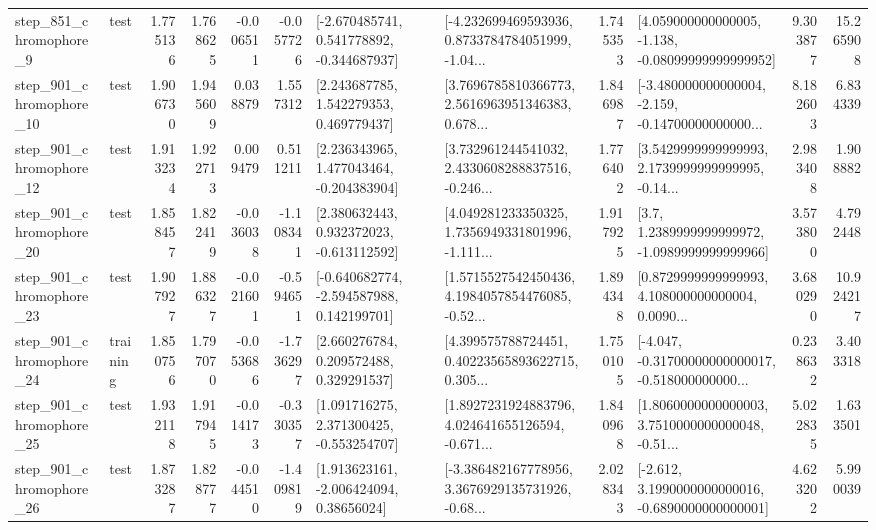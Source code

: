 \begin{tabular}{llrrrrllrlrr}
   step\_851\_chromophore\_9 &      test &      1.775136 &    1.768625 &     -0.006511 & -0.057726 &   [-2.670485741, 0.541778892, -0.344687937] &  [-4.232699469593936, 0.8733784784051999, -1.04... &       1.745353 &  [4.059000000000005, -1.138, -0.08099999999999952] &            9.303877 &         15.265908 \\
  step\_901\_chromophore\_10 &      test &      1.906730 &    1.945609 &      0.038879 &  1.557312 &     [2.243687785, 1.542279353, 0.469779437] &  [3.7696785810366773, 2.5616963951346383, 0.678... &       1.846987 &  [-3.480000000000004, -2.159, -0.14700000000000... &            8.182603 &          6.834339 \\
  step\_901\_chromophore\_12 &      test &      1.913234 &    1.922713 &      0.009479 &  0.511211 &    [2.236343965, 1.477043464, -0.204383904] &  [3.732961244541032, 2.4330608288837516, -0.246... &       1.776402 &  [3.5429999999999993, 2.1739999999999995, -0.14... &            2.983408 &          1.908882 \\
  step\_901\_chromophore\_20 &      test &      1.858457 &    1.822419 &     -0.036038 & -1.108341 &    [2.380632443, 0.932372023, -0.613112592] &  [4.049281233350325, 1.7356949331801996, -1.111... &       1.917925 &     [3.7, 1.2389999999999972, -1.0989999999999966] &            3.573800 &          4.792448 \\
  step\_901\_chromophore\_23 &      test &      1.907927 &    1.886327 &     -0.021601 & -0.594651 &   [-0.640682774, -2.594587988, 0.142199701] &  [1.5715527542450436, 4.1984057854476085, -0.52... &       1.894348 &  [0.8729999999999993, 4.108000000000004, 0.0090... &            3.680290 &         10.924217 \\
  step\_901\_chromophore\_24 &  training &      1.850756 &    1.797070 &     -0.053686 & -1.736297 &     [2.660276784, 0.209572488, 0.329291537] &  [4.399575788724451, 0.40223565893622715, 0.305... &       1.750105 &  [-4.047, -0.31700000000000017, -0.518000000000... &            0.238632 &          3.403318 \\
  step\_901\_chromophore\_25 &      test &      1.932118 &    1.917945 &     -0.014173 & -0.330357 &    [1.091716275, 2.371300425, -0.553254707] &  [1.8927231924883796, 4.024641655126594, -0.671... &       1.840968 &  [1.8060000000000003, 3.7510000000000048, -0.51... &            5.022835 &          1.633501 \\
  step\_901\_chromophore\_26 &      test &      1.873287 &    1.828777 &     -0.044510 & -1.409819 &     [1.913623161, -2.006424094, 0.38656024] &  [-3.386482167778956, 3.3676929135731926, -0.68... &       2.028343 &  [-2.612, 3.1990000000000016, -0.6890000000000001] &            4.623202 &          5.990039 \\

\end{tabular}
